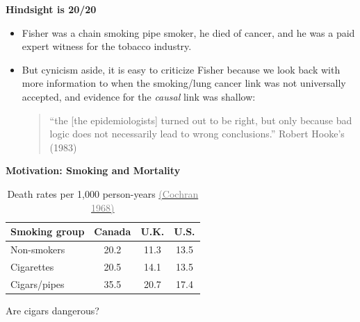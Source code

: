 \documentclass[notes=show]{beamer}
\newcommand{\myurlshort}[2]{\href{#1}{\textcolor{gray}{\textsf{#2}}}}
\begin{document}
\begin{frame}[plain]
	\begin{center}
	\textbf{Hindsight is 20/20}
	\end{center}
	
		\begin{itemize}
		\item Fisher was a chain smoking pipe smoker, he died of cancer, and he was a paid expert witness for the tobacco industry.  
		\item But cynicism aside, it is easy to criticize Fisher because we look back with more information to when the smoking/lung cancer link was not universally accepted, and evidence for the \emph{causal} link was shallow: \begin{quote}  ``the [the epidemiologists] turned out to be right, but only because bad logic does not necessarily lead to wrong conclusions.'' Robert Hooke's (1983)\end{quote}
		\end{itemize}

\end{frame}


\begin{frame}[plain]
	\begin{center}
	\textbf{Motivation: Smoking and Mortality}
	\end{center}
	
	\begin{table}\centering
		\caption{Death rates per 1,000 person-years \myurlshort{http://psycnet.apa.org/psycinfo/1968-16440-001}{(Cochran 1968)}}
		\begin{center}
		\begin{tabular}{lccc}
		\hline \hline
		\multicolumn{1}{l}{Smoking group}&
		\multicolumn{1}{c}{Canada}&
		\multicolumn{1}{c}{U.K.}&
		\multicolumn{1}{c}{U.S.}\\
		\hline
		Non-smokers & 20.2 & 11.3 & 13.5\\
		Cigarettes & 20.5 & 14.1 & 13.5 \\
		Cigars/pipes & 35.5 & 20.7 & 17.4\\
		\hline
		\end{tabular}
		\end{center}
	\end{table}
	
Are cigars dangerous?
	
\end{frame}
\end{document}

